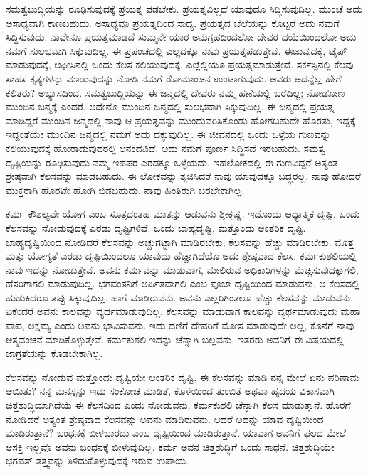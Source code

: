 ಸಮತ್ವಬುದ್ಧಿಯನ್ನು ರೂಢಿಸುವುದಕ್ಕೆ ಪ್ರಯತ್ನ ಪಡಬೇಕು. ಪ್ರಯತ್ನವಿಲ್ಲದೆ ಯಾವುದೂ ಸಿದ್ಧಿಸುವುದಿಲ್ಲ. ಮುಂಚೆ ಅದು ಅಸಾಧ್ಯವಾಗಿ ಕಾಣಬಹುದು. ಅಸಾಧ್ಯವೂ ಪ್ರಯತ್ನದಿಂದ ಸಾಧ್ಯ. ಪ್ರಯತ್ನದ ಬೆಲೆಯನ್ನು ಕೊಟ್ಟರೆ ಅದು ನಮಗೆ ಸಿದ್ಧಿಸುವುದು. ನಾವೇನೂ ಪ್ರಯತ್ನಮಾಡದೆ ಸುಮ್ಮನೇ ಯಾರ ಅನುಗ್ರಹದಿಂದಲೋ ದೇವರ ದಯೆಯಿಂದಲೋ ಅದು ನಮಗೆ ಸುಲಭವಾಗಿ ಸಿಕ್ಕುವುದಿಲ್ಲ. ಈ ಪ್ರಪಂಚದಲ್ಲಿ ಎಲ್ಲದಕ್ಕೂ ನಾವು ಪ್ರಯತ್ನಪಡುತ್ತೇವೆ. ಈಜುವುದಕ್ಕೆ, ಟೈಪ್ ಮಾಡುವುದಕ್ಕೆ, ಆಫೀಸಿನಲ್ಲಿ ಒಂದು ಕೆಲಸ ಕಲಿಯುವುದಕ್ಕೆ, ಎಲ್ಲೆಲ್ಲಿಯೂ ಪ್ರಯತ್ನಮಾಡುತ್ತೇವೆ. ಸರ್ಕಸ್ಸಿನಲ್ಲಿ ಕೆಲವು ಸಾಹಸ ಕೃತ್ಯಗಳನ್ನು ಮಾಡುವುದನ್ನು ನೋಡಿ ನಮಗೆ ರೋಮಾಂಚನ ಉಂಟಾಗುವುದು. ಅವರು ಅದನ್ನೆಲ್ಲ ಹೇಗೆ ಕಲಿತರು? ಅಭ್ಯಾಸದಿಂದ. ಸಮತ್ವಬುದ್ಧಿಯನ್ನು ಈ ಜನ್ಮದಲ್ಲಿ ದೇವರು ನಮ್ಮ ಹಣೆಯಲ್ಲಿ ಬರೆದಿಲ್ಲ; ನೋಡೋಣ ಮುಂದಿನ ಜನ್ಮಕ್ಕೆ ಎಂದರೆ, ಅದೇನೊ ಮುಂದಿನ ಜನ್ಮದಲ್ಲಿ ಸುಲಭವಾಗಿ ಸಿಕ್ಕುವುದಿಲ್ಲ. ಈ ಜನ್ಮದಲ್ಲಿ ಪ್ರಯತ್ನ ಮಾಡಿದ್ದರೆ ಮುಂದಿನ ಜನ್ಮದಲ್ಲಿ ನಾವು ಆ ಪ್ರಯತ್ನವನ್ನು ಮುಂದುವರಿಸಿಕೊಂಡು ಹೋಗಬಹುದೇ ಹೊರತು, ಇದ್ದಕ್ಕೆ ಇದ್ದಂತೆಯೇ ಮುಂದಿನ ಜನ್ಮದಲ್ಲಿ ನಮಗೆ ಅದು ದಕ್ಕುವುದಿಲ್ಲ. ಈ ಜೀವನದಲ್ಲಿ ಒಂದು ಒಳ್ಳೆಯ ಗುಣವನ್ನು ಕಲಿಯುವುದಕ್ಕೆ ಹೋರಾಡುವುದರಲ್ಲಿ ಆನಂದವಿದೆ. ಅದು ನಮಗೆ ಪೂರ್ಣ ಸಿದ್ಧಿಸದೆ ಇರಬಹುದು. ಸಮತ್ವ ದೃಷ್ಟಿಯನ್ನು ರೂಢಿಸುವುದು ನಮ್ಮ ಇಹಪರ ಎರಡಕ್ಕೂ ಒಳ್ಳೆಯದು. ಇಹಲೋಕದಲ್ಲಿ ಈ ಗುಣವಿದ್ದರೆ ಅತ್ಯಂತ ಶ್ರೇಷ್ಠವಾಗಿ ಕೆಲಸವನ್ನು ಮಾಡಬಹುದು. ಈ ಲೋಕವನ್ನು ತ್ಯಜಿಸಿದರೆ ನಾವು ಯಾವುದಕ್ಕೂ ಬದ್ಧರಲ್ಲ. ನಾವು ಹೋದರೆ ಮುಕ್ತರಾಗಿ ಹೊರಟೇ ಹೋಗಿ ಬಿಡಬಹುದು. ನಾವು ಹಿಂತಿರುಗಿ ಬರಬೇಕಾಗಿಲ್ಲ.

ಕರ್ಮ ಕೌಶಲ್ಯವೇ ಯೋಗ ಎಂಬ ಸೂತ್ರದಂತಹ ಮಾತನ್ನು ಆಡುವನು ಶ‍್ರೀಕೃಷ್ಣ. ಇದೊಂದು ಆಧ್ಯಾತ್ಮಿಕ ದೃಷ್ಟಿ. ಒಂದು ಕೆಲಸವನ್ನು ನೋಡುವುದಕ್ಕೆ ಎರಡು ದೃಷ್ಟಿಗಳಿವೆ. ಒಂದು ಬಾಹ್ಯದೃಷ್ಟಿ, ಮತ್ತೊಂದು ಆಂತರಿಕ ದೃಷ್ಟಿ. ಬಾಹ್ಯದೃಷ್ಟಿಯಿಂದ ನೋಡಿದರೆ ಕೆಲಸವನ್ನು ಅಚ್ಚುಗಟ್ಟಾಗಿ ಮಾಡಿರಬೇಕು; ಕೆಲಸವನ್ನು ಹೆಚ್ಚು ಮಾಡಿರಬೇಕು. ಮೊತ್ತ ಮತ್ತು ಯೋಗ್ಯತೆ ಎರಡು ದೃಷ್ಟಿಯಿಂದಲೂ ಯಾವುದು ಹೆಚ್ಚಾಗಿದೆಯೊ ಅದು ಶ್ರೇಷ್ಠವಾದ ಕೆಲಸ. ಕರ್ಮಕುಶಲಿಯಲ್ಲಿ ನಾವು ಇದನ್ನು ನೋಡುತ್ತೇವೆ. ಅವನು ಕರ್ಮವನ್ನು ಮಾಡುವಾಗ, ಮೇಲಿರುವ ಅಧಿಕಾರಿಗಳನ್ನು ಮೆಚ್ಚಿಸುವುದಕ್ಕಾಗಲಿ, ಹೆಸರಿಗಾಗಲಿ ಮಾಡುವುದಿಲ್ಲ. ಭಗವಂತನಿಗೆ ಅರ್ಪಿತವಾಗಲಿ ಎಂಬ ಪೂಜಾ ದೃಷ್ಟಿಯಿಂದ ಮಾಡುವನು. ಆ ಕೆಲಸದಲ್ಲಿ ಹುಡುಕಿದರೂ ತಪ್ಪು ಸಿಕ್ಕುವುದಿಲ್ಲ. ಹಾಗೆ ಮಾಡಿರುವನು. ಅವನು ಎಲ್ಲರಿಗಿಂತಲೂ ಹೆಚ್ಚು ಕೆಲಸವನ್ನು ಮಾಡುವನು. ಏಕೆಂದರೆ ಅವನು ಕಾಲವನ್ನು ವ್ಯರ್ಥಮಾಡುವುದಿಲ್ಲ. ಕೆಲಸವನ್ನು ಮಾಡುವಾಗ ಕಾಲವನ್ನು ವ್ಯರ್ಥಮಾಡುವುದು ಮಹಾ ಪಾಪ, ಅಕ್ಷಮ್ಯ ಎಂದು ಅವನು ಭಾವಿಸುವನು. ಇದು ದಣಿಗೆ ದೇವರಿಗೆ ಮೋಸ ಮಾಡುವುದೇ ಅಲ್ಲ, ಕೊನೆಗೆ ನಾವು ಆತ್ಮವಂಚನೆ ಮಾಡಿಕೊಳ್ಳುತ್ತೇವೆ. ಕರ್ಮಕುಶಲಿ ಇದನ್ನು ಚೆನ್ನಾಗಿ ಬಲ್ಲವನು. ಇತರರು ಅವನಿಗೆ ಈ ವಿಷಯದಲ್ಲಿ ಜಾಗ್ರತೆಯನ್ನು ಕೊಡಬೇಕಾಗಿಲ್ಲ.

ಕೆಲಸವನ್ನು ನೋಡುವ ಮತ್ತೊಂದು ದೃಷ್ಟಿಯೇ ಆಂತರಿಕ ದೃಷ್ಟಿ. ಈ ಕೆಲಸವನ್ನು ಮಾಡಿ ನನ್ನ ಮೇಲೆ ಏನು ಪರಿಣಾಮ ಆಯಿತು? ನನ್ನ ಮನಸ್ಸನ್ನು ಇದು ಸಂಕೋಚ ಮಾಡಿತೆ, ಕೊಳೆಯಿಂದ ತುಂಬಿತೆ ಅಥವಾ ಹೃದಯ ವಿಕಾಸವಾಗಿ ಚಿತ್ತಶುದ್ಧಿಯಾಗಿದೆಯೆ ಈ ಕೆಲಸದಿಂದ ಎಂದು ನೋಡುವನು. ಕರ್ಮಕುಶಲಿ ಚೆನ್ನಾಗಿ ಕೆಲಸ ಮಾಡುತ್ತಾನೆ. ಹೊರಗೆ ನೋಡಿದರೆ ಅತ್ಯಂತ ಶ್ರೇಷ್ಠವಾದ ಕೆಲಸವನ್ನು ಅವನು ಮಾಡಿರುವನು. ಆದರೆ ಅದನ್ನು ಯಾವ ದೃಷ್ಟಿಯಿಂದ ಮಾಡಿರುತ್ತಾನೆ? ಬಂಧನಕ್ಕೆ ಬೀಳಬಾರದು ಎಂಬ ದೃಷ್ಟಿಯಿಂದ ಮಾಡಿರುತ್ತಾನೆ. ಯಾವಾಗ ಅವನಿಗೆ ಫಲದ ಮೇಲೆ ಆಸಕ್ತಿ ಇಲ್ಲವೊ ಅವನು ಬಂಧನಕ್ಕೆ ಬೀಳುವುದಿಲ್ಲ. ಕರ್ಮ ಅವನ ಚಿತ್ತಶುದ್ಧಿಗೆ ಒಂದು ಸಾಧನೆ. ಚಿತ್ತಶುದ್ಧಿಯೇ ಭಗವತ್ ತತ್ತ್ವವನ್ನು ತಿಳಿದುಕೊಳ್ಳುವುದಕ್ಕೆ ಇರುವ ಉಪಾಯ.

